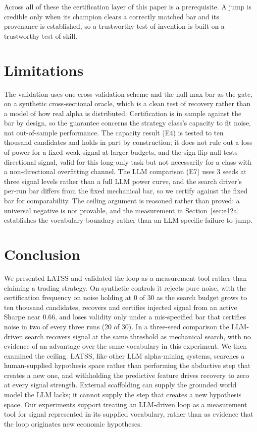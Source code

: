 \documentclass[11pt]{article}
\begin{document}
Across all of these the certification layer of this paper is a prerequisite. A jump is credible only
when its champion clears a correctly matched bar and its provenance is established, so a trustworthy
test of invention is built on a trustworthy test of skill.

\section{Limitations}
\label{sec:limitations}

The validation uses one cross-validation scheme and the null-max bar as the gate, on a synthetic
cross-sectional oracle, which is a clean test of recovery rather than a model of how real alpha is
distributed. Certification is in sample against the bar by design, so the guarantee concerns the
strategy class's capacity to fit noise, not out-of-sample performance. The capacity result (E4) is
tested to ten thousand candidates and holds in part by construction; it does not rule out a loss of
power for a fixed weak signal at larger budgets, and the sign-flip null tests directional signal,
valid for this long-only task but not necessarily for a class with a non-directional overfitting
channel. The LLM comparison (E7) uses 3 seeds at three signal levels rather than a full LLM power
curve, and the search driver's per-run bar differs from the fixed mechanical bar, so we certify
against the fixed bar for comparability. The ceiling argument is reasoned rather than proved: a
universal negative is not provable, and the measurement in Section~\ref{sec:e12a} establishes the
vocabulary boundary rather than an LLM-specific failure to jump.

\section{Conclusion}

We presented LATSS and validated the loop as a measurement tool rather than claiming a trading
strategy. On synthetic controls it rejects pure noise, with the certification frequency on noise
holding at 0 of 30 as the search budget grows to ten thousand candidates, recovers and certifies
injected signal from an active Sharpe near 0.66, and loses validity only under a mis-specified bar that
certifies noise in two of every three runs (20 of 30). In a three-seed comparison the LLM-driven search
recovers signal at the same threshold as mechanical search, with no evidence of an advantage over the
same vocabulary in this experiment. We then examined the ceiling. LATSS, like other LLM
alpha-mining systems, searches a human-supplied hypothesis space rather than performing the abductive
step that creates a new one, and withholding the predictive feature drives recovery to zero at every
signal strength. External scaffolding can supply the grounded world model the LLM lacks; it cannot
supply the step that creates a new hypothesis space. Our experiments support treating an LLM-driven
loop as a measurement tool for signal represented in its supplied vocabulary, rather than as
evidence that the loop originates new economic hypotheses.
\end{document}
